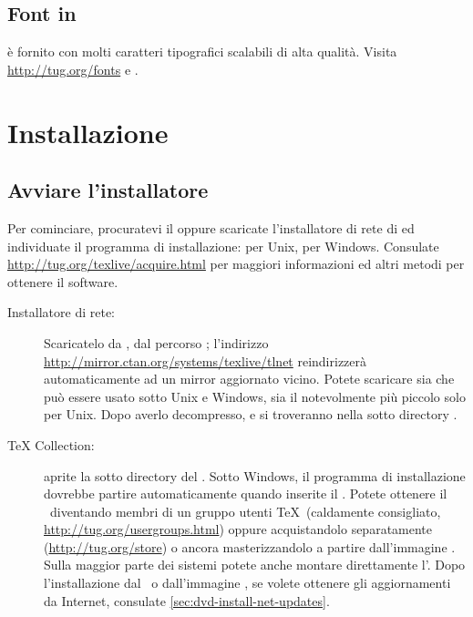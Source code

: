 \documentclass{article}
\begin{document}
\subsection{Font in \protect\TL}
\label{sec:tl-fonts}

\TL{} è fornito con molti caratteri tipografici scalabili di alta qualità.
Visita \url{http://tug.org/fonts} e
.


\section{Installazione}
\label{sec:install}

\subsection{Avviare l'installatore}
\label{sec:inst-start}

Per cominciare, procuratevi il \DVD{} \TK{} oppure scaricate
l'installatore di rete di \TL{} ed individuate il programma di
installazione:  per Unix, 
per Windows. Consulate \url{http://tug.org/texlive/acquire.html} per
maggiori informazioni ed altri metodi per ottenere il software.

\begin{description}
\item [Installatore di rete:] Scaricatelo da \CTAN, dal percorso
; l'indirizzo
\url{http://mirror.ctan.org/systems/texlive/tlnet} reindirizzerà
automaticamente ad un mirror aggiornato vicino. Potete scaricare sia
 che può essere usato sotto Unix e Windows, sia
il notevolmente più piccolo  solo per Unix.
Dopo averlo decompresso,  e 
si troveranno nella sotto directory .

\item [\DVD{} \TeX{} Collection:] aprite la sotto directory
 del \DVD. Sotto Windows, il programma di installazione
dovrebbe partire automaticamente quando inserite il \DVD. Potete ottenere il
\DVD\ diventando membri di un gruppo utenti \TeX\ (caldamente consigliato,
\url{http://tug.org/usergroups.html}) oppure acquistandolo separatamente
(\url{http://tug.org/store}) o ancora masterizzandolo a partire
dall'immagine \ISO. Sulla maggior parte dei sistemi potete anche montare
direttamente l'\ISO. Dopo l'installazione dal \DVD\ o dall'immagine \ISO, se
volete ottenere gli aggiornamenti da Internet, consulate
\ref{sec:dvd-install-net-updates}.

\end{description}
\end{document}
